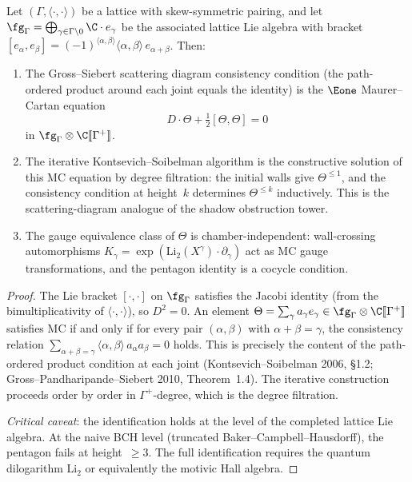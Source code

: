 \begin{theorem}
\label{thm:scattering-mc}
Let $(\Gamma, \langle\cdot,\cdot\rangle)$ be a lattice with skew-symmetric pairing, and let $\fg_\Gamma = \bigoplus_{\gamma \in \Gamma \setminus 0} \C \cdot e_\gamma$ be the associated lattice Lie algebra with bracket $[e_\alpha, e_\beta] = (-1)^{\langle\alpha,\beta\rangle} \langle\alpha,\beta\rangle \, e_{\alpha+\beta}$. Then:
\begin{enumerate}[label=\textup{(\roman*)}]
 \item The Gross--Siebert scattering diagram consistency condition \textup{(}the path-ordered product around each joint equals the identity\textup{)} is the $\Eone$ Maurer--Cartan equation
 \[
 D \cdot \Theta + \tfrac{1}{2}[\Theta, \Theta] = 0
 \]
 in $\fg_\Gamma \otimes \C[\![\Gamma^+]\!]$.
 \item The iterative Kontsevich--Soibelman algorithm is the constructive solution of this MC equation by degree filtration: the initial walls give $\Theta^{\leq 1}$, and the consistency condition at height~$k$ determines $\Theta^{\leq k}$ inductively. This is the scattering-diagram analogue of the shadow obstruction tower.
 \item The gauge equivalence class of $\Theta$ is chamber-independent: wall-crossing automorphisms $K_\gamma = \exp(\mathrm{Li}_2(X^\gamma) \cdot \partial_\gamma)$ act as MC gauge transformations, and the pentagon identity is a cocycle condition.
\end{enumerate}
\end{theorem}

\begin{proof}
The Lie bracket $[\cdot,\cdot]$ on $\fg_\Gamma$ satisfies the Jacobi identity (from the bimultiplicativity of $\langle\cdot,\cdot\rangle$), so $D^2 = 0$. An element $\Theta = \sum_\gamma a_\gamma e_\gamma \in \fg_\Gamma \otimes \C[\![\Gamma^+]\!]$ satisfies MC if and only if for every pair $(\alpha,\beta)$ with $\alpha + \beta = \gamma$, the consistency relation $\sum_{\alpha+\beta=\gamma} \langle\alpha,\beta\rangle \, a_\alpha a_\beta = 0$ holds. This is precisely the content of the path-ordered product condition at each joint (Kontsevich--Soibelman 2006, \S 1.2; Gross--Pandharipande--Siebert 2010, Theorem~1.4). The iterative construction proceeds order by order in $\Gamma^+$-degree, which is the degree filtration.

\emph{Critical caveat}: the identification holds at the level of the completed lattice Lie algebra. At the naive BCH level (truncated Baker--Campbell--Hausdorff), the pentagon fails at height~$\geq 3$. The full identification requires the quantum dilogarithm $\mathrm{Li}_2$ or equivalently the motivic Hall algebra.
\end{proof}


